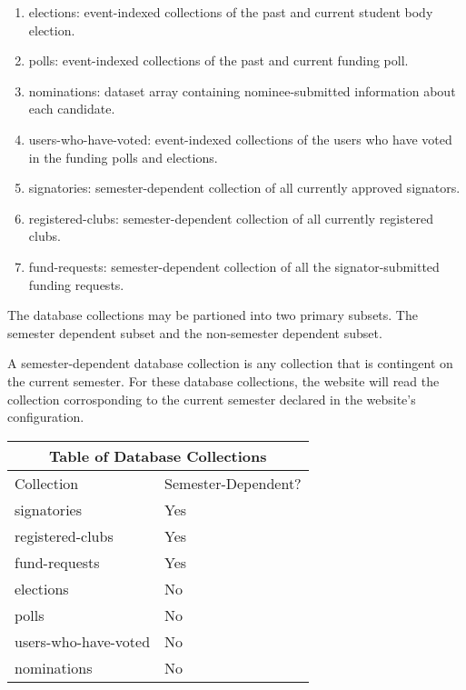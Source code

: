 \documentclass[a4paper]{article}
\begin{document}
\begin{enumerate}
  \item elections: event-indexed collections of the past and current student body election.
  \item polls: event-indexed collections of the past and current funding poll.
  \item nominations: dataset array containing nominee-submitted information about each candidate.
  \item users-who-have-voted: event-indexed collections of the users who have voted in the funding polls and elections.
  \item signatories: semester-dependent collection of all currently approved signators.
  \item registered-clubs: semester-dependent collection of all currently registered clubs.
  \item fund-requests: semester-dependent collection of all the signator-submitted funding requests.
\end{enumerate}

The database collections may be partioned into two primary subsets. The semester dependent subset and the non-semester dependent subset.

\begin{definition*}
A semester-dependent database collection is any collection that is contingent on the current semester. For these database collections, the website will read the collection corrosponding to the current semester declared in the website's configuration.
\end{definition*}

\begin{center}
\begin{tabular}{ |p{4cm}||p{4cm}|  }
 \hline
 \multicolumn{2}{|c|}{Table of Database Collections} \\
 \hline
 Collection & Semester-Dependent? \\
 \hline
 signatories & Yes \\
 registered-clubs & Yes \\
 fund-requests & Yes \\
 \hline
 elections & No \\
 polls & No \\
 users-who-have-voted & No \\
 nominations & No \\
 \hline
\end{tabular}
\end{center}
\end{document}
